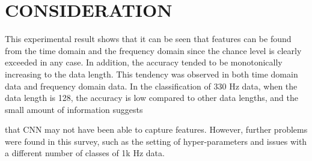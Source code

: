\documentclass[letterpaper,  10 pt,  conference]{ieeeconf}  %
\begin{document}


\section{%
CONSIDERATION}
This experimental result shows that it can be seen that features can be found from the time domain and the frequency domain since the chance level is clearly exceeded in any case.
In addition,  the accuracy tended to be monotonically increasing to the data length.  
This tendency was observed in both time domain data and frequency domain data. 
In the classification of 330 Hz data,  when the data length is 128,  the accuracy is low compared to other data lengths,  and the small amount of information suggests 


that CNN may not have been able to capture features.  However,  further problems were found in this survey,  such as the setting of hyper-parameters and issues with a different number of classes of 1k Hz data. 
%
\end{document}
